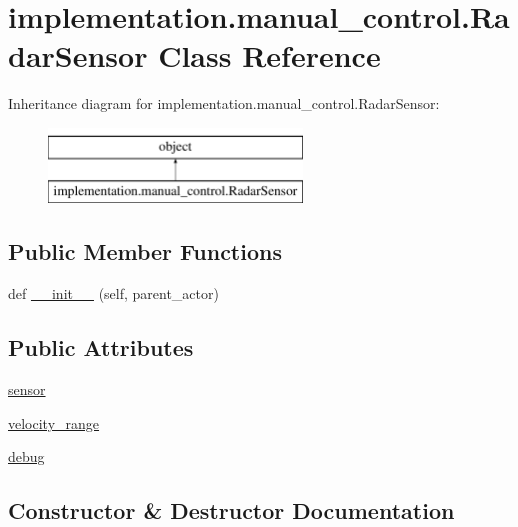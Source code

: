 \hypertarget{classimplementation_1_1manual__control_1_1_radar_sensor}{}\section{implementation.\+manual\+\_\+control.\+Radar\+Sensor Class Reference}
\label{classimplementation_1_1manual__control_1_1_radar_sensor}
Inheritance diagram for implementation.\+manual\+\_\+control.\+Radar\+Sensor\+:\begin{figure}[H]
\begin{center}
\leavevmode
\includegraphics[height=2.000000cm]{classimplementation_1_1manual__control_1_1_radar_sensor}
\end{center}
\end{figure}
\subsection*{Public Member Functions}
\begin{DoxyCompactItemize}
\item 
def \hyperlink{classimplementation_1_1manual__control_1_1_radar_sensor_a89c9fcbfdbe0ca15c2095143b387affe}{\+\_\+\+\_\+init\+\_\+\+\_\+} (self, parent\+\_\+actor)
\end{DoxyCompactItemize}
\subsection*{Public Attributes}
\begin{DoxyCompactItemize}
\item 
\hyperlink{classimplementation_1_1manual__control_1_1_radar_sensor_a73fe61c634c78ea7673ee91521d61ab8}{sensor}
\item 
\hyperlink{classimplementation_1_1manual__control_1_1_radar_sensor_a049e3192b2bd3aa880858500f069992b}{velocity\+\_\+range}
\item 
\hyperlink{classimplementation_1_1manual__control_1_1_radar_sensor_a3dd1cefeb96ddc248a5e729532b516ad}{debug}
\end{DoxyCompactItemize}


\subsection{Constructor \& Destructor Documentation}
\mbox{\label{classimplementation_1_1manual__control_1_1_radar_sensor_a89c9fcbfdbe0ca15c2095143b387affe}} 
